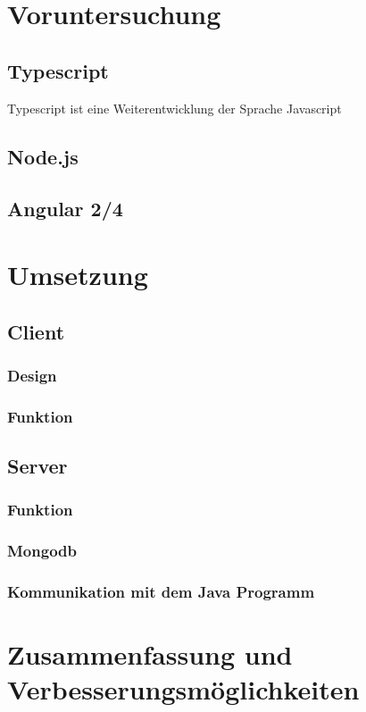 \section{Voruntersuchung}

\subsection{Typescript}
Typescript ist eine Weiterentwicklung der Sprache Javascript

\subsection{Node.js}

\subsection{Angular 2/4}

\section{Umsetzung}

\subsection{Client}

\subsubsection{Design}

\subsubsection{Funktion}

\subsection{Server}

\subsubsection{Funktion}

\subsubsection{Mongodb}

\subsubsection{Kommunikation mit dem Java Programm}

\section{Zusammenfassung und Verbesserungsmöglichkeiten}